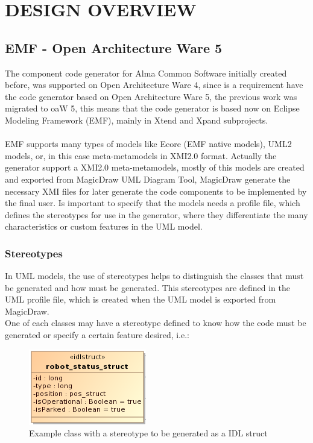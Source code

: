 \section{DESIGN OVERVIEW}
\subsection{EMF - Open Architecture Ware 5}
The component code generator for Alma Common Software initially created before,
was supported on Open Architecture Ware 4, since is a requirement have the
code generator based on Open Architecture Ware 5, the previous work was
migrated to oaW 5, this means that the code generator is based now on Eclipse
Modeling Framework (EMF), mainly in Xtend and Xpand subprojects.\\
\\
EMF supports many types of models like Ecore (EMF native models), UML2 models,
or, in this case meta-metamodels in XMI2.0 format. Actually the generator
support a XMI2.0 meta-metamodels, mostly of this models are created and exported
from MagicDraw UML Diagram Tool, MagicDraw generate the necessary XMI files
for later generate the code components to be implemented by the final user. 
Is important to specify that the models needs a profile file, which defines the
stereotypes for use in the generator, where they differentiate the
many characteristics or custom features in the UML model.

\subsubsection{Stereotypes}
In UML models, the use of stereotypes helps to distinguish the classes that
must be generated and how must be generated. This stereotypes are defined in
the UML profile file, which is created when the UML model is exported from
MagicDraw.\\
One of each classes may have a stereotype defined to know how the code must be
generated or specify a certain feature desired, i.e.: 

\begin{figure}[h!t]
\begin{center}
\includegraphics[scale=0.3]{images/idlstruct}
\caption{\label{fig:ex_diag}Example class with a stereotype to be generated as
a IDL struct}
\end{center}
\end{figure}

